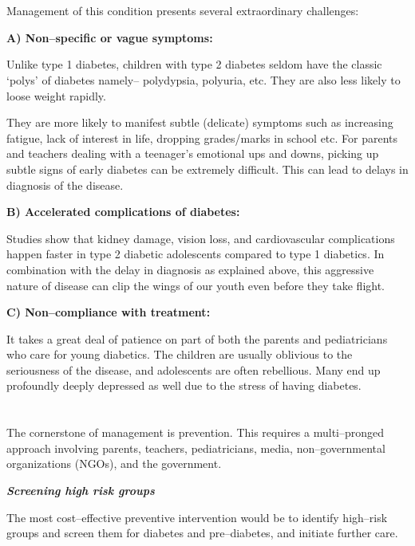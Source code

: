 \section*{}

Management of this condition presents several extraordinary challenges:

\textbf{A) Non–specific or vague symptoms:}

Unlike type 1 diabetes, children with type 2 diabetes seldom have the classic ‘polys’ of diabetes namely– polydypsia, polyuria, etc. They are also less likely to loose weight rapidly.

They are more likely to manifest subtle (delicate) symptoms such as increasing fatigue, lack of interest in life, dropping grades/marks in school etc. For parents and teachers dealing with a teenager’s emotional ups and downs, picking up subtle signs of early diabetes can be extremely difficult. This can lead to delays in diagnosis of the disease.

\textbf{B) Accelerated complications of diabetes:}

Studies show that kidney damage, vision loss, and cardiovascular complications happen faster in type 2 diabetic adolescents compared to type 1 diabetics. In combination with the delay in diagnosis as explained above, this aggressive nature of disease can clip the wings of our youth even before they take flight.

\textbf{C) Non–compliance with treatment:}

It takes a great deal of patience on part of both the parents and pediatricians who care for young diabetics. The children are usually oblivious to the seriousness of the disease, and adolescents are often rebellious. Many end up profoundly deeply depressed as well due to the stress of having diabetes.


\section*{}

The cornerstone of management is prevention. This requires a multi–pronged approach involving parents, teachers, pediatricians, media, non–governmental organizations (NGOs), and the government.

\textbf{\textit{Screening high risk groups}}

The most cost–effective preventive intervention would be to identify high–risk groups and screen them for diabetes and pre–diabetes, and initiate further care.

